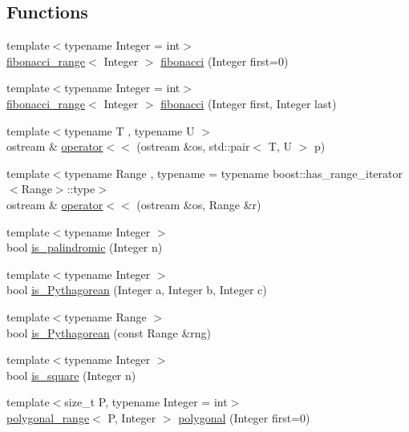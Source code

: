 \subsection*{\-Functions}
\begin{DoxyCompactItemize}
\item 
{\footnotesize template$<$typename Integer  = int$>$ }\\\hyperlink{classyuh_1_1fibonacci__range}{fibonacci\-\_\-range}$<$ \-Integer $>$ \hyperlink{namespaceyuh_a11988532f81d143e1b5b74d461dd8067}{fibonacci} (\-Integer first=0)
\item 
{\footnotesize template$<$typename Integer  = int$>$ }\\\hyperlink{classyuh_1_1fibonacci__range}{fibonacci\-\_\-range}$<$ \-Integer $>$ \hyperlink{namespaceyuh_a17b1d33879798b95bdefe171df90380a}{fibonacci} (\-Integer first, \-Integer last)
\item 
{\footnotesize template$<$typename T , typename U $>$ }\\ostream \& \hyperlink{namespaceyuh_a6a041724aebe4e8e1c6509d8eaa9e9cf}{operator$<$$<$} (ostream \&os, std\-::pair$<$ \-T, \-U $>$ p)
\item 
{\footnotesize template$<$typename Range , typename  = typename boost\-::has\-\_\-range\-\_\-iterator$<$\-Range$>$\-::type$>$ }\\ostream \& \hyperlink{namespaceyuh_af1b5747f2430fdb089dc2f4f75799746}{operator$<$$<$} (ostream \&os, \-Range \&r)
\item 
{\footnotesize template$<$typename Integer $>$ }\\bool \hyperlink{namespaceyuh_afc7f4ca69e0d8cb035be348d77d2a33e}{is\-\_\-palindromic} (\-Integer n)
\item 
{\footnotesize template$<$typename Integer $>$ }\\bool \hyperlink{namespaceyuh_a14298c4b76f1a9d0537e7d5d67cfa784}{is\-\_\-\-Pythagorean} (\-Integer a, \-Integer b, \-Integer c)
\item 
{\footnotesize template$<$typename Range $>$ }\\bool \hyperlink{namespaceyuh_af94deeef5a14f79a6a51c6ca3155d03e}{is\-\_\-\-Pythagorean} (const \-Range \&rng)
\item 
{\footnotesize template$<$typename Integer $>$ }\\bool \hyperlink{namespaceyuh_a43d71ed08fec121213f4ad3acbdc4d26}{is\-\_\-square} (\-Integer n)
\item 
{\footnotesize template$<$size\-\_\-t \-P, typename Integer  = int$>$ }\\\hyperlink{classyuh_1_1polygonal__range}{polygonal\-\_\-range}$<$ \-P, \-Integer $>$ \hyperlink{namespaceyuh_ad748e41a574e1b3042a2741cf023c40c}{polygonal} (\-Integer first=0)

\end{DoxyCompactItemize}

